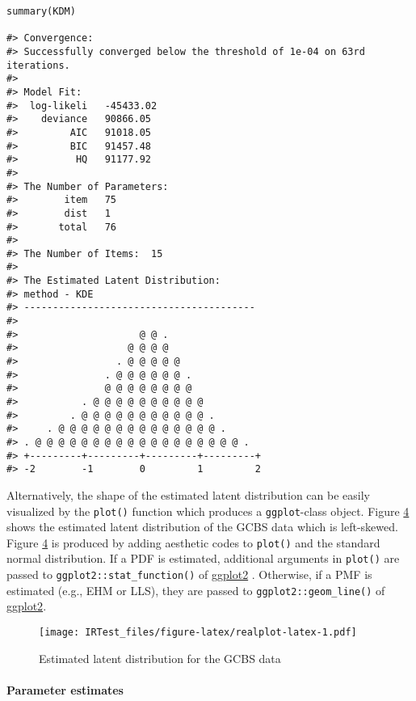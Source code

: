 \begin{verbatim}
summary(KDM)

#> Convergence:  
#> Successfully converged below the threshold of 1e-04 on 63rd iterations. 
#> 
#> Model Fit:  
#>  log-likeli   -45433.02 
#>    deviance   90866.05 
#>         AIC   91018.05 
#>         BIC   91457.48 
#>          HQ   91177.92 
#> 
#> The Number of Parameters:  
#>        item   75 
#>        dist   1 
#>       total   76 
#> 
#> The Number of Items:  15 
#> 
#> The Estimated Latent Distribution:  
#> method - KDE 
#> ----------------------------------------
#>                                           
#>                     @ @ .                 
#>                   @ @ @ @                 
#>                 . @ @ @ @ @               
#>               . @ @ @ @ @ @ .             
#>               @ @ @ @ @ @ @ @             
#>           . @ @ @ @ @ @ @ @ @ @           
#>         . @ @ @ @ @ @ @ @ @ @ @ .         
#>     . @ @ @ @ @ @ @ @ @ @ @ @ @ @ .       
#> . @ @ @ @ @ @ @ @ @ @ @ @ @ @ @ @ @ @ .   
#> +---------+---------+---------+---------+
#> -2        -1        0         1         2
\end{verbatim}

Alternatively, the shape of the estimated latent distribution can be
easily visualized by the \texttt{plot()} function which produces a
\texttt{ggplot}-class object. Figure
\protect\hyperlink{fig:realplot-latex}{4} shows the estimated latent distribution
of the GCBS data which is left-skewed. Figure
\protect\hyperlink{fig:realplot-latex}{4} is produced by adding aesthetic codes to
\texttt{plot()} and the standard normal distribution. If a PDF is estimated,
additional arguments in \texttt{plot()} are passed to
\texttt{ggplot2::stat\_function()} of
\href{https://CRAN.R-project.org/package=ggplot2}{ggplot2} \citep{ggplot2}.
Otherwise, if a PMF is estimated (e.g., EHM or LLS), they are passed to
\texttt{ggplot2::geom\_line()} of
\href{https://CRAN.R-project.org/package=ggplot2}{ggplot2}.

\begin{figure}
\hypertarget{fig:realplot-latex}{%
\centering
\texttt{[image: IRTest\_files/figure-latex/realplot-latex-1.pdf]}
\caption{Estimated latent distribution for the GCBS
data}\label{fig:realplot-latex}
}
\end{figure}

\hypertarget{parameter-estimates-1}{%
\paragraph{Parameter estimates}\label{parameter-estimates-1}}

